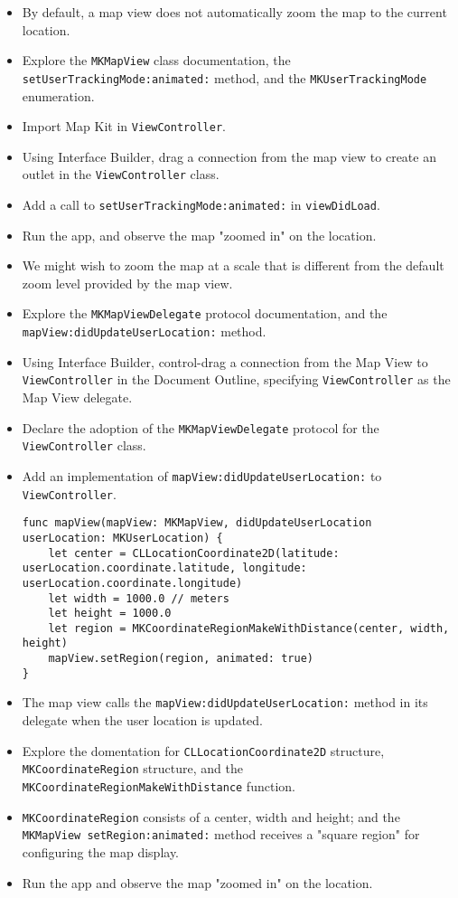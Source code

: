 \documentclass[a4paper,11pt]{scrartcl}
\begin{document}
\begin{itemize}
\item By default, a map view does not automatically zoom the map to the current location.
\item Explore the \texttt{MKMapView} class documentation, the \texttt{setUserTrackingMode:animated:} method, and the \texttt{MKUserTrackingMode} enumeration.
\item Import Map Kit in \texttt{ViewController}.
\item Using Interface Builder, drag a connection from the map view to create an outlet in the \texttt{ViewController} class.
\item Add a call to \texttt{setUserTrackingMode:animated:} in \texttt{viewDidLoad}.
\item Run the app, and observe the map "zoomed in" on the location.
\item We might wish to zoom the map at a scale that is different from the default zoom level provided by the map view.
\item Explore the \texttt{MKMapViewDelegate} protocol documentation, and the \texttt{mapView:didUpdateUserLocation:} method.
\item Using Interface Builder, control-drag a connection from the Map View to \texttt{ViewController} in the Document Outline, specifying \texttt{ViewController} as the Map View delegate.
\item Declare the adoption of the \texttt{MKMapViewDelegate} protocol for the \texttt{ViewController} class.
\item Add an implementation of \texttt{mapView:didUpdateUserLocation:} to \texttt{ViewController}.
\begin{lstlisting}
func mapView(mapView: MKMapView, didUpdateUserLocation userLocation: MKUserLocation) {
	let center = CLLocationCoordinate2D(latitude: userLocation.coordinate.latitude, longitude: userLocation.coordinate.longitude)
	let width = 1000.0 // meters
	let height = 1000.0
	let region = MKCoordinateRegionMakeWithDistance(center, width, height)
	mapView.setRegion(region, animated: true)
}
\end{lstlisting}
\item The map view calls the \texttt{mapView:didUpdateUserLocation:} method in its delegate when the user location is updated.
\item Explore the domentation for \texttt{CLLocationCoordinate2D} structure, \texttt{MKCoordinateRegion} structure, and the \texttt{MKCoordinateRegionMakeWithDistance} function.
\item \texttt{MKCoordinateRegion} consists of a center, width and height; and the \texttt{MKMapView setRegion:animated:} method receives a "square region" for configuring the map display.
\item Run the app and observe the map "zoomed in" on the location.
\end{itemize}
\end{document}

